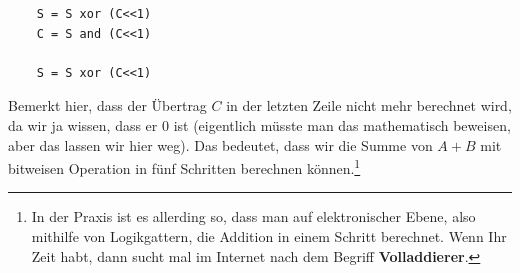 \begin{exercise}
\begin{solution}
\begin{verbatim}
    S = S xor (C<<1)
    C = S and (C<<1)

    S = S xor (C<<1)
\end{verbatim}
      Bemerkt hier, dass der Übertrag $C$ in der letzten Zeile nicht mehr berechnet wird, da wir ja wissen, dass er 0 ist (eigentlich müsste man das mathematisch beweisen, aber das lassen wir hier weg). Das bedeutet, dass wir die Summe von $A+B$ mit bitweisen Operation in fünf Schritten berechnen können.\footnote{%
        In der Praxis ist es allerding so, dass man auf elektronischer Ebene, also mithilfe von Logikgattern, die Addition in einem Schritt berechnet. Wenn Ihr Zeit habt, dann sucht mal im Internet nach dem Begriff \textbf{Volladdierer}.}
\end{solution}
\end{exercise}
